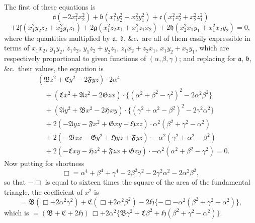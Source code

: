 \documentclass[11pt]{article}
\begin{document}
The first of these equations is
\[ \mathfrak{a}(-2x_{1}^{2}x_{2}^{2})+\mathfrak{b}(x_{1}^{2}y_{2}^{2}+x_{2}^{2}y_{1}^{2})+\mathfrak{c}(x_{1}^{2}z_{2}^{2}+x_{2}^{2}z_{1}^{2}) \]
\[ +2\mathfrak{f}(x_{1}^{2}y_{2}z_{2}+x_{2}^{2}y_{1}z_{1})+2\mathfrak{g}(x_{1}^{2}z_{2}x_{1}+x_{1}^{2}z_{1}x_{2})+2\mathfrak{h}(x_{2}^{2}x_{1}y_{1}+x_{1}^{2}x_{2}y_{2})=0, \]
where the quantities multiplied by $\mathfrak{a}$, $\mathfrak{b}$, \&c.\ are all of them easily expressible in terms of $x_{1}x_{2}$, $y_{1}y_{2}$, $z_{1}z_{2}$, $y_{1}z_{2}+y_{2}z_{1}$, $z_{1}x_{2}+z_{2}x_{1}$, $x_{1}y_{2}+x_{2}y_{1}$, which are respectively proportional to given functions of $(\alpha,\beta,\gamma)$; and replacing for $\mathfrak{a}$, $\mathfrak{b}$, \&c.\ their values, the equation is
{\small\begin{align*}
&(\mathfrak{B}z^{2}+\mathfrak{C}y^{2}-2\mathfrak{F}yz)\cdot 2\alpha^{4}\\
&\quad+(\mathfrak{C}x^{2}+\mathfrak{A}z^{2}-2\mathfrak{G}zx)\cdot \{(\alpha^{2}+\beta^{2}-\gamma^{2})^{2}-2\alpha^{2}\beta^{2}\}\\
&\quad+(\mathfrak{A}y^{2}+\mathfrak{B}x^{2}-2\mathfrak{H}xy)\cdot \{(\gamma^{2}+\alpha^{2}-\beta^{2})^{2}-2\gamma^{2}\alpha^{2}\}\\
&\quad+2(-\mathfrak{A}yz-\mathfrak{F}x^{2}+\mathfrak{G}xy+\mathfrak{H}xz)\cdot \alpha^{2}(\beta^{2}+\gamma^{2}-\alpha^{2})\\
&\quad+2(-\mathfrak{B}zx-\mathfrak{G}y^{2}+\mathfrak{H}yz+\mathfrak{F}yz)\cdot -\alpha^{2}(\gamma^{2}+\alpha^{2}-\beta^{2})\\
&\quad+2(-\mathfrak{C}xy-\mathfrak{H}z^{2}+\mathfrak{F}zx+\mathfrak{G}zy)\cdot -\alpha^{2}(\alpha^{2}+\beta^{2}-\gamma^{2})=0.
\end{align*}}
Now putting for shortness
\[ \Box = \alpha^{4}+\beta^{4}+\gamma^{4}-2\beta^{2}\gamma^{2}-2\gamma^{2}\alpha^{2}-2\alpha^{2}\beta^{2}, \]
so that $-\Box$ is equal to sixteen times the square of the area of the fundamental triangle, the coefficient of $x^{2}$ is
\[ = \mathfrak{B}(\Box+2\alpha^{2}\gamma^{2})+\mathfrak{C}(\Box+2\alpha^{2}\beta^{2})-2\mathfrak{H}\{-\Box-\alpha^{2}(\beta^{2}+\gamma^{2}-\alpha^{2})\}, \]
which is $= (\mathfrak{B}+\mathfrak{C}+2\mathfrak{H})\,\Box + 2\alpha^{2}\{\mathfrak{B}\gamma^{2}+\mathfrak{C}\beta^{2}+\mathfrak{H}(\beta^{2}+\gamma^{2}-\alpha^{2})\}.$
\end{document}

